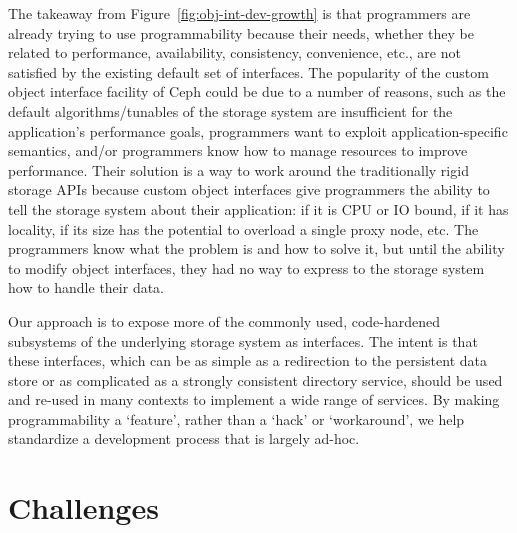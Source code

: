 \documentclass[preprint]{sigplanconf-eurosys}
\begin{document}
The takeaway from Figure~\ref{fig:obj-int-dev-growth} is that programmers are
already trying to use programmability because their needs, whether they be
related to performance, availability, consistency, convenience, etc., are not
satisfied by the existing default set of interfaces. The popularity of the custom object
interface facility of Ceph could be due to a number of reasons, such as the
default algorithms/tunables of the storage system are insufficient for the
application's performance goals, programmers want to exploit
application-specific semantics, and/or programmers know how to manage resources
to improve performance. Their solution is a way to work around the
traditionally rigid storage APIs because custom object interfaces give
programmers the ability to tell the storage system about their application: if
it is CPU or IO bound, if it has locality, if its size has the potential to
overload a single proxy node, etc.  The programmers know what the problem is
and how to solve it, but until the ability to modify object interfaces, they
had no way to express to the storage system how to handle their data.

Our approach is to expose more of the commonly used, code-hardened subsystems
of the underlying storage system as interfaces. The intent is that these
interfaces, which can be as simple as a redirection to the persistent data
store or as complicated as a strongly consistent directory service, should be
used and re-used in many contexts to implement a wide range of services. By
making programmability a `feature', rather than a `hack' or `workaround', we
help standardize a development process that is largely ad-hoc.

%

\section{Challenges}
\label{sec:challenges}
\end{document}
